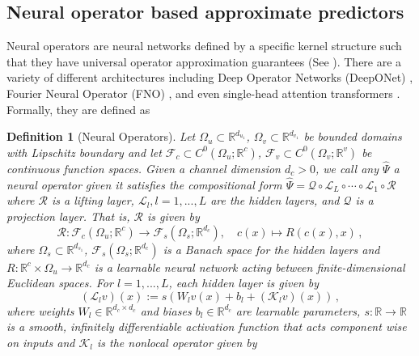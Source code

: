 \documentclass[letterpaper, 10 pt, conference]{ieeeconf}  %
\newtheorem{definition}[theorem]{Definition}
\begin{document}
\subsection{Neural operator based approximate predictors} \label{subsec:neural-op-approximators}
Neural operators are neural networks defined by a specific kernel structure such that they have universal operator approximation guarantees (See \cite{Neural_Operator:2023}). There are a variety of different architectures including Deep Operator Networks (DeepONet) \cite{deeponet:2021}, Fourier Neural Operator (FNO) \cite{FNO:2021}, and even single-head attention transformers \cite{Neural_Operator:2023}. Formally, they are defined as 
\begin{definition}[Neural Operators] \label{definition:neural-operator} \cite[Section 1.2]{lanthaler2024nonlocalitynonlinearityimpliesuniversality} Let $\Omega_u \subset \mathbb{R}^{d_{u_1}}$, $\Omega_v \subset \mathbb{R}^{d_{v_1}}$ be bounded domains with Lipschitz boundary and let  $\mathcal{F}_c \subset C^0(\Omega_u; \mathbb{R}^c)$, $\mathcal{F}_v \subset C^0(\Omega_v; \mathbb{R}^v)$ be continuous function spaces.
    Given a channel dimension $d_c > 0$, we call any $\hat{\Psi}$ a neural operator given it satisfies the compositional form $\hat{\Psi} = \mathcal{Q} \circ \mathcal{L}_L \circ \cdots \circ \mathcal{L}_1 \circ \mathcal{R}$ where  $\mathcal{R}$ is a lifting layer, $\mathcal{L}_l, l=1,..., L$ are the hidden layers, and $\mathcal{Q}$ is a projection layer. That is, 
    $\mathcal{R}$ is given by 
    \begin{equation}
    \mathcal{R} : \mathcal{F}_c(\Omega_u; \mathbb{R}^c) \rightarrow \mathcal{F}_s(\Omega_s; \mathbb{R}^{d_c}), \quad c(x) \mapsto R(c(x), x)\,, 
\end{equation} where $\Omega_s \subset \mathbb{R}^{d_{s_1}}$, $\mathcal{F}_s(\Omega_s; \mathbb{R}^{d_c})$ is a Banach space for the hidden layers and $R: \mathbb{R}^c \times \Omega_u \rightarrow \mathbb{R}^{d_c}$ is a learnable neural network acting between finite-dimensional Euclidean spaces. For $l=1, ..., L$, each hidden layer is given by 
\begin{equation} \label{eq:generalNeuralOperator}
    (\mathcal{L}_l v)(x) := s \left( W_l v(x) + b_l + (\mathcal{K}_lv)(x)\right)\,, 
\end{equation}
where weights $W_l \in \mathbb{R}^{d_c \times d_c}$ and biases $b_l \in \mathbb{R}^{d_c}$ are learnable parameters, $s: \mathbb{R} \rightarrow \mathbb{R}$ is a smooth, infinitely differentiable activation function that acts component wise on inputs and $\mathcal{K}_l$ is the nonlocal operator given by 

\end{definition}
\end{document}
